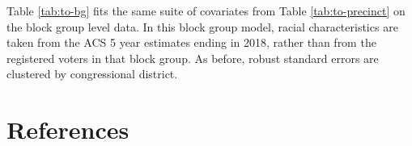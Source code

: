 \documentclass[
  12pt,
]{article}
\begin{document}
Table \ref{tab:to-bg} fits the same suite of covariates from Table \ref{tab:to-precinct} on the block group level data. In this block group model, racial characteristics are taken from the ACS 5 year estimates ending in 2018, rather than from the registered voters in that block group. As before, robust standard errors are clustered by congressional district.

\begin{singlespace}


\end{singlespace}

\newpage

\hypertarget{references}{%
\section*{References}\label{references}}
\end{document}
